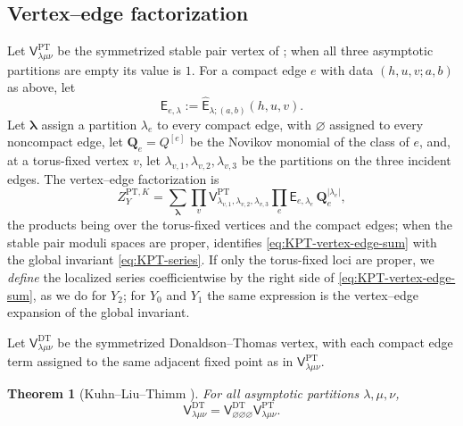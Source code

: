 \documentclass{amsart}
\newtheorem{theorem}{Theorem}
\theoremstyle{definition}
\numberwithin{equation}{section}
\begin{document}
\subsection{Vertex--edge factorization}
Let \(\mathsf V^{\mathrm{PT}}_{\lambda\mu\nu}\) be the symmetrized stable pair vertex of \cite[Section~1.2, equation~(3)]{KuhnLiuThimm}; when all three asymptotic partitions are empty its value is \(1\).  For a compact edge \(e\) with data \((h,u,v;a,b)\) as above, let
\[
 \mathsf E_{e,\lambda}
 :=\widehat{\mathsf E}_{\lambda;(a,b)}(h,u,v).
\]
Let \(\boldsymbol\lambda\) assign a partition \(\lambda_e\) to every compact edge, with \(\varnothing\) assigned to every noncompact edge, let \(\mathbf Q_e=Q^{[e]}\) be the Novikov monomial of the class of \(e\), and, at a torus-fixed vertex \(v\), let \(\lambda_{v,1},\lambda_{v,2},\lambda_{v,3}\) be the partitions on the three incident edges.  The vertex--edge factorization is
\begin{equation}
 Z_Y^{\mathrm{PT},K}
 =
 \sum_{\boldsymbol\lambda}
 \prod_v
 \mathsf V^{\mathrm{PT}}_{\lambda_{v,1},
 \lambda_{v,2},\lambda_{v,3}}
 \prod_e\mathsf E_{e,\lambda_e}\,
 \mathbf Q_e^{|\lambda_e|},
\label{eq:KPT-vertex-edge-sum}
\end{equation}
the products being over the torus-fixed vertices and the compact edges; when the stable pair moduli spaces are proper, \cite[Section~1.2, equation~(3)]{KuhnLiuThimm} identifies \eqref{eq:KPT-vertex-edge-sum} with the global invariant \eqref{eq:KPT-series}.  If only the torus-fixed loci are proper, we \emph{define} the localized series coefficientwise by the right side of \eqref{eq:KPT-vertex-edge-sum}, as we do for \(Y_2\); for \(Y_0\) and \(Y_1\) the same expression is the vertex--edge expansion of the global invariant.

Let \(\mathsf V^{\mathrm{DT}}_{\lambda\mu\nu}\) be the symmetrized Donaldson--Thomas vertex, with each compact edge term assigned to the same adjacent fixed point as in \(\mathsf V^{\mathrm{PT}}_{\lambda\mu\nu}\).

\begin{theorem}[Kuhn--Liu--Thimm \cite{KuhnLiuThimm}]
\label{thm:KLT-vertex}
For all asymptotic partitions \(\lambda,\mu,\nu\),
\begin{equation}
 \mathsf V^{\mathrm{DT}}_{\lambda\mu\nu}
 =
 \mathsf V^{\mathrm{DT}}_{\varnothing\varnothing\varnothing}
 \mathsf V^{\mathrm{PT}}_{\lambda\mu\nu}.
\label{eq:KLT-vertex}
\end{equation}
\end{theorem}
\end{document}
